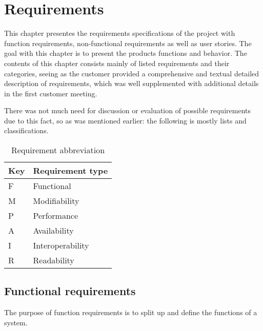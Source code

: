 \chapter{Requirements}
This chapter presentes the requirements specifications of the project with function requirements, non-functional requirements as well as user stories. The goal with this chapter is to present the products functions and behavior. The contents of this chapter consists mainly of listed requirements and their categories, seeing as the customer provided a comprehensive and textual detailed description of requirements,
which was well supplemented with additional details in the first customer meeting.

There was not much need for discussion or evaluation of possible requirements due to this fact, so as was mentioned earlier: the following is mostly lists and classifications.
\newpage

 \normalsize

\begin{table}[H]
\begin{center}
\begin{tabular}{|p{1.5cm}|p{6cm}|}
	\hline
	\textbf{Key} & \textbf{Requirement type} \\
	\hline
	F & Functional\\
	\hline
	M & Modifiability\\
	\hline
	P & Performance\\
	\hline
	A & Availability\\
	\hline
	I & Interoperability\\
	\hline
	R & Readability\\
	
	\hline
\end{tabular}
\end{center}
\caption{Requirement abbreviation}
\end{table}


\section{Functional requirements}
The purpose of function requirements is to split up and define the functions of a system. 

 \normalsize

